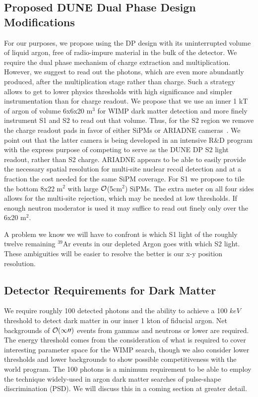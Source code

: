 \documentclass[a4paper,11pt]{article}
\begin{document}
\subsection{Proposed DUNE Dual Phase Design Modifications }
For our purposes, we propose using the DP design with its uninterrupted volume of liquid argon, free of radio-impure material in the bulk of the detector. We require the dual phase mechanism of charge extraction and multiplication.  However, we suggest to read out the photons, which are even more abundantly produced, after the multiplication stage rather than charge. Such a strategy allows to get to lower physics thresholds with high significance and simpler instrumentation than for charge readout. We propose that we use an inner 1 kT of argon of volume 6x6x20 m$^3$ for WIMP dark matter detection and more finely instrument S1 and S2 to read out that volume. Thus, for the S2 region we remove the charge readout pads in favor of either SiPMs or ARIADNE cameras~\cite{ARIADNE}. We point out that the latter camera is being developed in an intensive R\&D program with the express purpose of competing to serve as the DUNE DP S2 light readout, rather than S2 charge. ARIADNE appears to be able to easily provide the necessary spatial resolution for  multi-site nuclear recoil detection and at a fraction the cost needed for the same SiPM coverage. For S1 we propose to tile the bottom 8x22 m$^2$ with large $\cal{O}$(5cm$^2$) SiPMs.  The extra meter on all four sides allows for the multi-site rejection, which may be needed at low thresholds. If enough neutron moderator is used it may suffice to read out finely only over the 6x20 m$^2$.

A problem we know we will have to confront is which S1 light of the roughly twelve remaining $^{39}$Ar events in our depleted Argon goes with which S2 light. These ambiguities will be easier to resolve the better is our x-y position resolution.

\subsection{Detector Requirements for Dark Matter}
We require roughly 100 detected photons and the ability to achieve a 100 $keV$ threshold to detect dark matter in our inner 1 kton of fiducial argon. Net backgrounds of $\cal{O}(100)$ events from gammas and neutrons or lower are required. The energy threshold comes from the consideration of what is required to cover interesting parameter space for the WIMP search, though we also consider lower thresholds and lower backgrounds to show possible competitiveness with the world program. The 100 photons is a minimum requirement to be able to employ the technique widely-used in argon dark matter searches of pulse-shape discrimination (PSD). We will discuss this in a coming section at greater detail.
\end{document}
